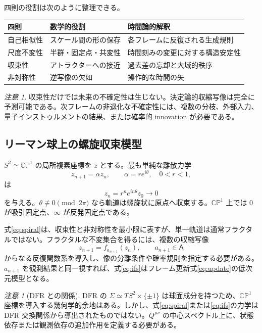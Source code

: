 \documentclass[a4paper,11pt]{ltjsarticle}
\theoremstyle{remark}
\newtheorem{remark}[definition]{注意}
\newcommand{\CP}{\mathbb{CP}}
\begin{document}
四則の役割は次のように整理できる。
\begin{center}
\begin{tabular}{lll}
\toprule
四則 & 数学的役割 & 時間論的解釈 \\
\midrule
自己相似性 & スケール間の形の保存 & 各フレームに反復される生成規則 \\
尺度不変性 & 半群・固定点・共変性 & 時間刻みの変更に対する構造安定性 \\
収束性 & アトラクターへの接近 & 過去差の忘却と大域的秩序 \\
非対称性 & 逆写像の欠如 & 操作的な時間の矢 \\
\bottomrule
\end{tabular}
\end{center}

\begin{remark}
収束性だけでは未来の不確定性は生じない。決定論的収縮写像は完全に予測可能である。次フレームの非退化な不確定性には、複数の分枝、外部入力、量子インストゥルメントの結果、または確率的 innovation が必要である。
\end{remark}

\subsection{リーマン球上の螺旋収束模型}
$S^2\simeq\CP^1$ の局所複素座標を $z$ とする。最も単純な離散力学
\begin{equation}
 z_{n+1}=\alpha z_n,
 \qquad \alpha=re^{i\theta},\quad 0<r<1,
 \label{eq:spiral}
\end{equation}
は
\begin{equation}
 z_n=r^ne^{in\theta}z_0\longrightarrow0
\end{equation}
を与える。$\theta\not\equiv0\pmod{2\pi}$ なら軌道は螺旋状に原点へ収束する。$\CP^1$ 上では $0$ が吸引固定点、$\infty$ が反発固定点である。

式\eqref{eq:spiral}は、収束性と非対称性を最小限に表すが、単一軌道は通常フラクタルではない。フラクタルな不変集合を得るには、複数の収縮写像
\begin{equation}
 z_{n+1}=f_{a_{n+1}}(z_n),
 \qquad a_{n+1}\in\mathsf A
 \label{eq:ifs}
\end{equation}
からなる反復関数系を導入し、像の分離条件や確率規則を指定する必要がある。$a_{n+1}$ を観測結果と同一視すれば、式\eqref{eq:ifs}はフレーム更新式\eqref{eq:update}の低次元模型となる。

\begin{remark}[DFR との関係]
DFR の $\Sigma\simeq TS^2\times\{\pm1\}$ は球面成分を持つため、$\CP^1$ 座標を導入する幾何学的余地はある。しかし、式\eqref{eq:spiral}または\eqref{eq:ifs}の力学は DFR 交換関係から導出されたものではない。$Q^{\mu\nu}$ の中心スペクトル上に、状態依存または観測依存の追加作用を定義する必要がある。
\end{remark}
\end{document}
